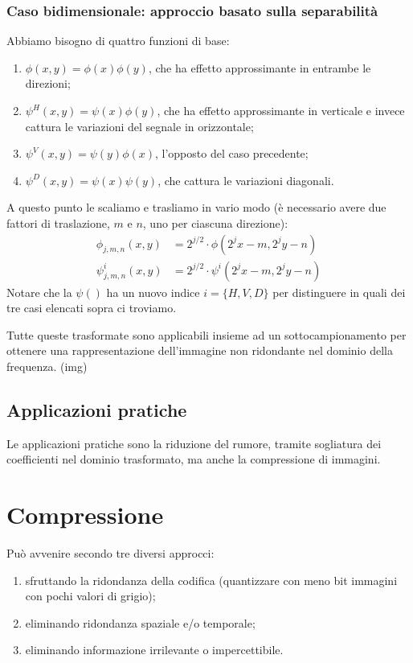 \documentclass[a4paper,11pt]{article}
\begin{document}
\subsubsection{Caso bidimensionale: approccio basato sulla separabilità}
Abbiamo bisogno di quattro funzioni di base:
\begin{enumerate}
    \item $\phi(x,y) = \phi(x)\phi(y)$, che ha effetto approssimante in entrambe le direzioni;
    \item $\psi^H(x,y) = \psi(x)\phi(y)$, che ha effetto approssimante in verticale e invece cattura le variazioni del segnale in orizzontale;
    \item $\psi^V(x,y) = \psi(y)\phi(x)$, l'opposto del caso precedente;
    \item $\psi^D(x,y) = \psi(x)\psi(y)$, che cattura le variazioni diagonali.
\end{enumerate}

A questo punto le scaliamo e trasliamo in vario modo (è necessario avere due fattori di traslazione, $m$ e $n$, uno per ciascuna direzione):
\begin{align*}
\phi_{j,m,n}(x,y) &= 2^{j/2} \cdot \phi(2^j x-m, 2^j y-n) \\
\psi^i_{j,m,n}(x,y) &= 2^{j/2} \cdot \psi^i(2^j x-m, 2^j y-n)
\end{align*}
Notare che la $\psi()$ ha un nuovo indice $i = \{H,V,D\}$ per distinguere in quali dei tre casi elencati sopra ci troviamo.

\par
Tutte queste trasformate sono applicabili insieme ad un sottocampionamento per ottenere una rappresentazione dell'immagine non ridondante nel dominio della frequenza. (img)

\subsection{Applicazioni pratiche}
Le applicazioni pratiche sono la riduzione del rumore, tramite sogliatura dei coefficienti nel dominio trasformato, ma anche la compressione di immagini.

\newpage

\section{Compressione}
Può avvenire secondo tre diversi approcci:
\begin{enumerate}
    \item sfruttando la ridondanza della codifica (quantizzare con meno bit immagini con pochi valori di grigio);
    \item eliminando ridondanza spaziale e/o temporale;
    \item eliminando informazione irrilevante o impercettibile.
\end{enumerate}
\end{document}
